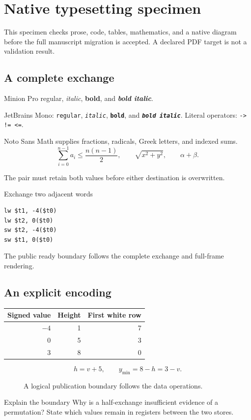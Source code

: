 \documentclass[12pt,letterpaper,openany]{book}
\begin{document}
\chapter{Native typesetting specimen}
This specimen checks prose, code, tables, mathematics, and a native diagram before the
full manuscript migration is accepted. A declared PDF target is not a validation result.
\section{A complete exchange}
Minion Pro regular, \textit{italic}, \textbf{bold}, and \textbf{\textit{bold italic}}.

JetBrains Mono: \texttt{regular}, \texttt{\textit{italic}},
\texttt{\textbf{bold}}, and \texttt{\textbf{\textit{bold italic}}}.
Literal operators: \texttt{-> != <=}.

Noto Sans Math supplies fractions, radicals, Greek letters, and indexed sums.
\[ \sum_{i=0}^{n-1} a_i \leq \frac{n(n-1)}{2}, \qquad \sqrt{x^2+y^2}, \qquad \alpha+\beta. \]

The pair must retain both values before either destination is overwritten.
\begin{MARSWorkedExample}{Exchange two adjacent words}
  \begin{verbatim}
lw $t1, -4($t0)
lw $t2, 0($t0)
sw $t2, -4($t0)
sw $t1, 0($t0)
\end{verbatim}
  The public ready boundary follows the complete exchange and full-frame rendering.
\end{MARSWorkedExample}
\section{An explicit encoding}
\begin{tabular}{rrr}
  \toprule
  Signed value & Height & First white row \\
  \midrule
  $-4$         & 1      & 7               \\
  0            & 5      & 3               \\
  3            & 8      & 0               \\
  \bottomrule
\end{tabular}
\[
  h=v+5,\qquad y_{\min}=8-h=3-v.
\]
\begin{figure}[htbp]
  \centering
  \caption{A logical publication boundary follows the data operations.}
\end{figure}
\begin{MARSExercise}{Explain the boundary}
  Why is a half-exchange insufficient evidence of a permutation? State which values
  remain in registers between the two stores.
\end{MARSExercise}
\end{document}
